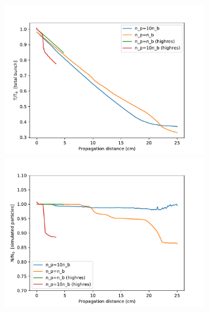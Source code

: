 \documentclass[%
onecolumn, notitlepage,
 amsmath,amssymb,
 aps,
]{article}
\begin{document}
\begin{figure}[!ht]
\centering
\includegraphics[width=0.78\textwidth]{Energies30pc_lowres.pdf}
\includegraphics[width=0.78\textwidth]{Particles30pc_lowres.pdf}
\end{figure}
\end{document}
